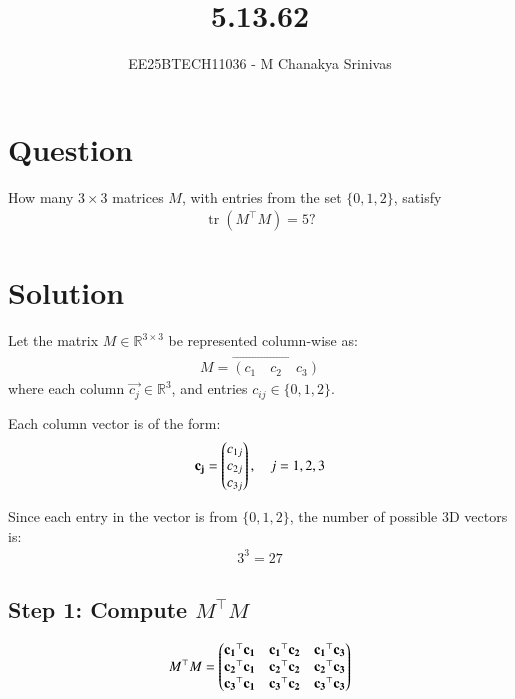 \documentclass[journal]{IEEEtran}
\begin{document}

\vspace{3cm}

\title{5.13.62}
\author{EE25BTECH11036 - M Chanakya Srinivas}
\maketitle

\renewcommand{\thetable}{\theenumi}
\setlength{\intextsep}{10pt}
\renewcommand\theequation{\arabic{equation}}



\section*{Question}

How many $3 \times 3$ matrices $M$, with entries from the set $\{0,1,2\}$, satisfy
\begin{align}
\operatorname{tr}(M^\top M) = 5?
\end{align}

\section*{Solution}

Let the matrix \( M \in \mathbb{R}^{3 \times 3} \) be represented column-wise as:
\begin{align}
M = \vec{(c_1 \quad c_2 \quad c_3)}
\end{align}
where each column \( \vec{c_j} \in \mathbb{R}^3 \), and entries \( c_{ij} \in \{0, 1, 2\} \).

Each column vector is of the form:
\begin{align}
\mathbf{c_j} = \begin{pmatrix}c_{1j} \\ c_{2j} \\ c_{3j}\end{pmatrix}, \quad j = 1,2,3
\end{align}

Since each entry in the vector is from \(\{0,1,2\}\), the number of possible 3D vectors is:
\begin{align}
3^3 = 27
\end{align}

\subsection*{Step 1: Compute \( M^\top M \)}

\begin{align}
M^\top M = 
\begin{pmatrix}
\mathbf{c_1}^\top \mathbf{c_1} & \mathbf{c_1}^\top \mathbf{c_2} & \mathbf{c_1}^\top \mathbf{c_3} \\
\mathbf{c_2}^\top \mathbf{c_1} & \mathbf{c_2}^\top \mathbf{c_2} & \mathbf{c_2}^\top \mathbf{c_3} \\
\mathbf{c_3}^\top \mathbf{c_1} & \mathbf{c_3}^\top \mathbf{c_2} & \mathbf{c_3}^\top \mathbf{c_3}
\end{pmatrix}
\end{align}
\end{document}
